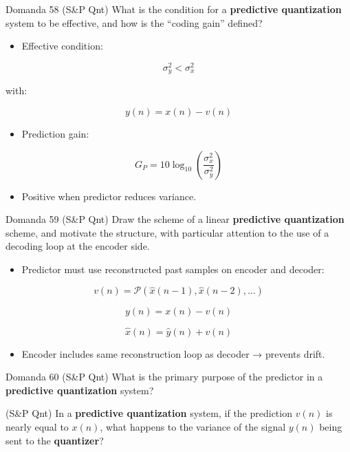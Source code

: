 \begin{questionbox}{Domanda 58}
(S\&P Qnt) What is the condition for a \textbf{predictive \textbf{quantization}} system to be effective, and how is the “coding gain” defined?
\end{questionbox}


\begin{itemize}
  \item Effective condition:
\end{itemize}


$$
\sigma_y^2 < \sigma_x^2
$$


with:


$$
y(n)=x(n)-v(n)
$$


\begin{itemize}
  \item Prediction gain:
\end{itemize}


$$
G_P=10\log_{10}\left(\frac{\sigma_x^2}{\sigma_y^2}\right)
$$


\begin{itemize}
  \item Positive when predictor reduces variance.
\end{itemize}



\begin{questionbox}{Domanda 59}
(S\&P Qnt) Draw the scheme of a linear \textbf{predictive \textbf{quantization}} scheme, and motivate the structure, with particular attention to the use of a decoding loop at the encoder side.
\end{questionbox}


\begin{itemize}
  \item Predictor must use reconstructed past samples on encoder and decoder:
\end{itemize}


$$
v(n)=\mathcal{P}(\hat{x}(n-1),\hat{x}(n-2),\dots)
$$



$$
y(n)=x(n)-v(n)
$$



$$
\hat{x}(n)=\hat{y}(n)+v(n)
$$


\begin{itemize}
  \item Encoder includes same reconstruction loop as decoder → prevents drift.
\end{itemize}



\begin{questionbox}{Domanda 60}
(S\&P Qnt) What is the primary purpose of the predictor in a \textbf{predictive \textbf{quantization}} system?

(S\&P Qnt) In a \textbf{predictive \textbf{quantization}} system, if the prediction $v(n)$ is nearly equal to $x(n)$, what happens to the variance of the signal $y(n)$ being sent to the \textbf{quantizer}?
\end{questionbox}


